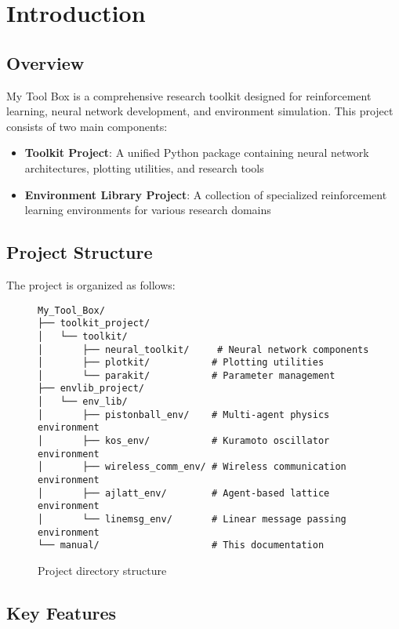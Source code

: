 \chapter{Introduction}

\section{Overview}

My Tool Box is a comprehensive research toolkit designed for reinforcement learning, neural network development, and environment simulation. This project consists of two main components:

\begin{itemize}
    \item \textbf{Toolkit Project}: A unified Python package containing neural network architectures, plotting utilities, and research tools
    \item \textbf{Environment Library Project}: A collection of specialized reinforcement learning environments for various research domains
\end{itemize}

\section{Project Structure}

The project is organized as follows:

\begin{figure}[H]
\centering
\begin{verbatim}
My_Tool_Box/
├── toolkit_project/
│   └── toolkit/
│       ├── neural_toolkit/     # Neural network components
│       ├── plotkit/           # Plotting utilities
│       └── parakit/           # Parameter management
├── envlib_project/
│   └── env_lib/
│       ├── pistonball_env/    # Multi-agent physics environment
│       ├── kos_env/           # Kuramoto oscillator environment
│       ├── wireless_comm_env/ # Wireless communication environment
│       ├── ajlatt_env/        # Agent-based lattice environment
│       └── linemsg_env/       # Linear message passing environment
└── manual/                    # This documentation
\end{verbatim}
\caption{Project directory structure}
\end{figure}

\section{Key Features}

